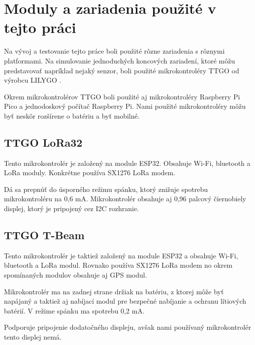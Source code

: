 \documentclass[slovak,master]{diploma}
\begin{document}
\section{Moduly a zariadenia použité v tejto práci}
Na vývoj a testovanie tejto práce boli použité rôzne zariadenia s rôznymi platformami. Na simulovanie jednoduchých koncových zariadení, 
ktoré môžu predstavovať napríklad nejaký senzor, boli použité mikrokontroléry TTGO od výrobcu LILYGO \cite{lilygo}.

Okrem mikrokontrolérov TTGO boli použité aj mikrokontroléry Raspberry Pi Pico a jednodoskový počítač Raspberry Pi.
Nami použité mikrokontroléry môžu byť neskôr rozšírene o batériu a byť mobilné.

\subsection{TTGO LoRa32}
Tento mikrokontrolér je založený na module ESP32. Obsahuje Wi-Fi, bluetooth a LoRa moduly. 
Konkrétne používa SX1276 LoRa modem.

Dá sa prepnúť do úsporného režimu spánku, ktorý znižuje spotrebu mikrokontroléru na 0,6 mA.
Mikrokontrolér obsahuje aj 0,96 palcový čiernobiely displej, ktorý je pripojený cez I2C rozhranie.

\subsection{TTGO T-Beam}
Tento mikrokontrolér je taktiež založený na module ESP32 a obsahuje Wi-Fi, bluetooth a LoRa modul.
Rovnako používa SX1276 LoRa modem no okrem spomínaných modulov obsahuje aj GPS modul.

Mikrokontrolér ma na zadnej strane držiak na batériu, z ktorej môže byť napájaný a taktiež aj nabíjací modul 
pre bezpečné nabíjanie a ochranu lítiových batérií.
V režime spánku ma spotrebu 0,2 mA.

Podporuje pripojenie dodatočného displeju, avšak nami používaný mikrokontrolér tento displej nemá.
\end{document}
